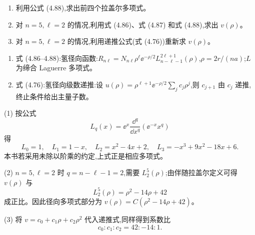 \begin{question}
\begin{enumerate}
\item 利用公式 (4.88),求出前四个拉盖尔多项式。
\item 对 $n=5,\ell=2$ 的情况,利用式 (4.86)、式 (4.87) 和式 (4.88),求出 $v(\rho)$。
\item 对 $n=5,\ell=2$ 的情况,利用递推公式(式 (4.76))重新求 $v(\rho)$。
\end{enumerate}

\par\smallskip
{}
\begin{enumerate}[leftmargin=2.2em,itemsep=0.12em,topsep=0.12em,parsep=0pt]
\item 式 (4.86--4.88):氢径向函数:$R_{n\ell}=N_{n\ell}\rho^\ell \ee^{-\rho/2}L_{n-\ell-1}^{2\ell+1}(\rho)$,$\rho=2r/(na)$;$L$ 为缔合 Laguerre 多项式。
\item 式 (4.76):氢径向级数递推:设 $u(\rho)=\rho^{\ell+1}\ee^{-\rho/2}\sum_j c_j\rho^j$,则 $c_{j+1}$ 由 $c_j$ 递推,终止条件给出主量子数。
\end{enumerate}

\begin{solution}

(1) 按公式
\[
L_q(x)=\ee^x\frac{\dd^q}{\dd x^q}(\ee^{-x}x^q)
\]
得
\[
L_0=1,
\quad L_1=1-x,
\quad L_2=x^2-4x+2,
\quad L_3=-x^3+9x^2-18x+6.
\]
本书若采用未除以阶乘的约定,上式正是相应多项式。

(2) $n=5,\ell=2$ 时 $q=n-\ell-1=2$,需要 $L_2^{5}(\rho)$;由伴随拉盖尔定义可得 $v(\rho)$ 与
\[
L_2^5(\rho)=\rho^2-14\rho+42
\]
成正比。因此径向多项式部分为 $v(\rho)=C(\rho^2-14\rho+42)$。

(3) 将 $v=c_0+c_1\rho+c_2\rho^2$ 代入递推式,同样得到系数比
\[
c_0:c_1:c_2=42:-14:1.
\]

\end{solution}
\end{question}

